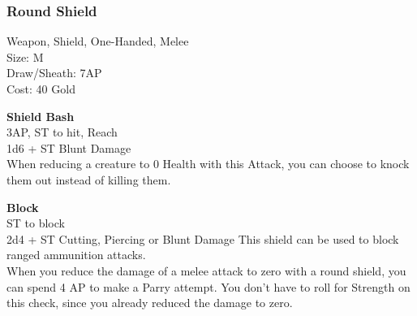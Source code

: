 \subsubsection{Round Shield}\label{weapon:roundShield}
Weapon, Shield, One-Handed, Melee\\
Size: M\\
Draw/Sheath: 7AP\\
Cost: 40 Gold

\textbf{Shield Bash}\\
3AP, ST to hit,  Reach\\
1d6 + \texttimes ST Blunt Damage\\
When reducing a creature to 0 Health with this Attack, you can choose to knock them out instead of killing them.

\textbf{Block}\\
ST to block\\
2d4 + \texttimes ST Cutting, Piercing or Blunt Damage
This shield can be used to block ranged ammunition attacks.\\
When you reduce the damage of a melee attack to zero with a round shield, you can spend 4 AP to make a Parry attempt.
You don't have to roll for Strength on this check, since you already reduced the damage to zero.\\
